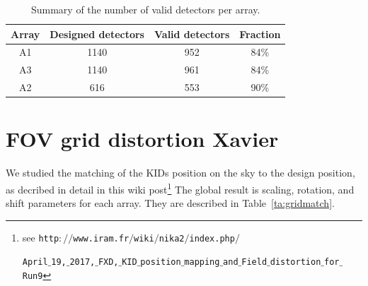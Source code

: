 
\begin{table}[ht]
\begin{center}  
  \begin{tabular}{|c|c|c|c|}
    \hline
    Array & Designed detectors &  Valid detectors & Fraction\\
    \hline\hline
    A1 & 1140 & 952 &  84\%\\
    A3 & 1140 & 961 &  84\%\\
    A2 & 616  & 553 &  90\%\\
    \hline
  \end{tabular}
  \caption[Number of detectors]{Summary of the number of valid detectors per array.}
  \label{tab:number_of_kids}
\end{center}    
\end{table}


\section{FOV grid distortion {\color{YellowGreen} Xavier }  }
\label{se:grid_distortion}

We studied the matching of the KIDs position on the sky to the
design position, as decribed in detail in this wiki post\footnote{see
  {\tt http$://$www.iram.fr$/$wiki$/$nika2$/$index.php$/$}
  
  {\tt April$\_$19,$\_$2017,$\_$FXD,$\_$KID$\_$position$\_$mapping$\_$and$\_$Field$\_$distortion$\_$for$\_$Run9}
}
The global result is scaling, rotation, and shift parameters for each
array. They are described in Table~\ref{ta:gridmatch}.

